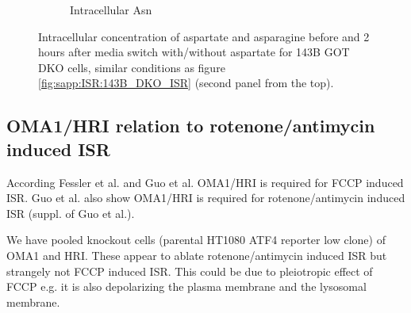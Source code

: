 \begin{figure}[!ht]
\begin{subfigure}[b]{0.35\textwidth}
         \caption{Intracellular Asn}
         \label{fig:sapp:ISR:143B_GOT_DKO_ISR_Asn_conc}
     \end{subfigure}
     \hfill
        \caption[Intracellular Asp/Asn at ISR in GOT DKO.]{
        Intracellular concentration of aspartate and asparagine before and 2 hours after media switch with/without aspartate for 143B GOT DKO cells, similar conditions as figure \ref{fig:sapp:ISR:143B_DKO_ISR} (second panel from the top).
        }
        \label{fig:sapp:ISR:143B_GOT_DKO_ISR_conc}
\end{figure}





\FloatBarrier
\subsection{OMA1/HRI relation to rotenone/antimycin induced ISR}
According Fessler et al. and Guo et al. \cite{Fessler2020-zk, Guo2020-ia} OMA1/HRI is required for FCCP induced ISR.
Guo et al. also show OMA1/HRI is required for rotenone/antimycin induced ISR (suppl. of Guo et al.).

We have pooled knockout cells (parental HT1080 ATF4 reporter low clone) of OMA1 and HRI.
These appear to ablate rotenone/antimycin induced ISR but strangely not FCCP induced ISR.
This could be due to pleiotropic effect of FCCP e.g. it is also depolarizing the plasma membrane and the lysosomal membrane.

